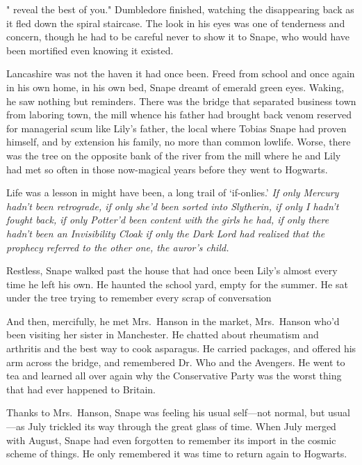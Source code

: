 "{\el} reveal the best of you." Dumbledore finished, watching the disappearing back as it fled down the spiral staircase. The look in his eyes was one of tenderness and concern, though he had to be careful never to show it to Snape, who would have been mortified even knowing it existed.

Lancashire was not the haven it had once been. Freed from school and once again in his own home, in his own bed, Snape dreamt of emerald green eyes. Waking, he saw nothing but reminders. There was the bridge that separated business town from laboring town, the mill whence his father had brought back venom reserved for managerial scum like Lily's father, the local where Tobias Snape had proven himself, and by extension his family, no more than common lowlife. Worse, there was the tree on the opposite bank of the river from the mill where he and Lily had met so often in those now-magical years before they went to Hogwarts.

Life was a lesson in might have been, a long trail of `if-onlies.' \emph{If only Mercury hadn't been retrograde, if only she'd been sorted into Slytherin, if only I hadn't fought back, if only Potter'd been content with the girls he had, if only there hadn't been an Invisibility Cloak{\el} if only the Dark Lord had realized that the prophecy referred to{\el} the other one, the auror's child.}

Restless, Snape walked past the house that had once been Lily's almost every time he left his own. He haunted the school yard, empty for the summer. He sat under the tree trying to remember every scrap of conversation{\el}

And then, mercifully, he met Mrs.~Hanson in the market, Mrs.~Hanson who'd been visiting her sister in Manchester. He chatted about rheumatism and arthritis and the best way to cook asparagus. He carried packages, and offered his arm across the bridge, and remembered Dr. Who and the Avengers. He went to tea and learned all over again why the Conservative Party was the worst thing that had ever happened to Britain.

Thanks to Mrs.~Hanson, Snape was feeling his usual self—not normal, but usual—as July trickled its way through the great glass of time. When July merged with August, Snape had even forgotten to remember its import in the cosmic scheme of things. He only remembered it was time to return again to Hogwarts.


